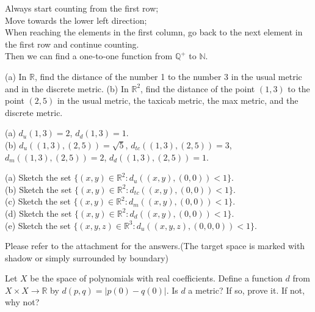 \documentclass[11pt, a4paper, UTF8]{ctexart}
\begin{document}
\begin{solution}
  Always start counting from the first row;\\
  Move towards the lower left direction;\\
  When reaching the elements in the first column, 
  go back to the next element in the first row and continue counting.\\
  Then we can find a one-to-one function from $\mathbb{Q}^{+}$ to $\mathbb{N}$.
\end{solution}

\begin{problem}[UD: 23.2]
  (a) In $\mathbb{R}$, find the distance of the number 1 to the number 
  3 in the usual metric and in the discrete metric.
  (b) In $\mathbb{R}^{2}$, find the distance of the point $(1,3)$ to 
  the point $(2,5)$ in the usual metric, the taxicab metric, the max 
  metric, and the discrete metric.
\end{problem}

\begin{solution}
  (a) $d_{u}(1,3) = 2$, $d_{d}(1,3) = 1$.\\
  (b) $d_{u}((1,3),(2,5)) = \sqrt5$, $d_{tc}((1,3),(2,5)) = 3$, 
  $d_{m}((1,3),(2,5)) = 2$, $d_{d}((1,3),(2,5)) = 1$.
\end{solution}

\begin{problem}[UD: 23.3]
  (a) Sketch the set $\{ (x,y) \in \mathbb{R}^{2}: d_{u}((x,y),(0,0)) < 1 \}$.\\
  (b) Sketch the set $\{ (x,y) \in \mathbb{R}^{2}: d_{tc}((x,y),(0,0)) < 1 \}$.\\
  (c) Sketch the set $\{ (x,y) \in \mathbb{R}^{2}: d_{m}((x,y),(0,0)) < 1 \}$.\\
  (d) Sketch the set $\{ (x,y) \in \mathbb{R}^{2}: d_{d}((x,y),(0,0)) < 1 \}$.\\
  (e) Sketch the set $\{ (x,y,z) \in \mathbb{R}^{3}: d_{u}((x,y,z),(0,0,0)) < 1 \}$.\\
\end{problem}

\begin{solution}
  Please refer to the attachment for the answers.(The target space is 
  marked with shadow or simply surrounded by boundary)
\end{solution}

\begin{problem}[UD: 23.10]
  Let $X$ be the space of polynomials with real coefficients. Define 
  a function $d$ from $X \times X \rightarrow \mathbb{R}$ by $d(p,q) = |p(0) - q(0)|$.
  Is $d$ a metric? If so, prove it. If not, why not?
\end{problem}
\end{document}
